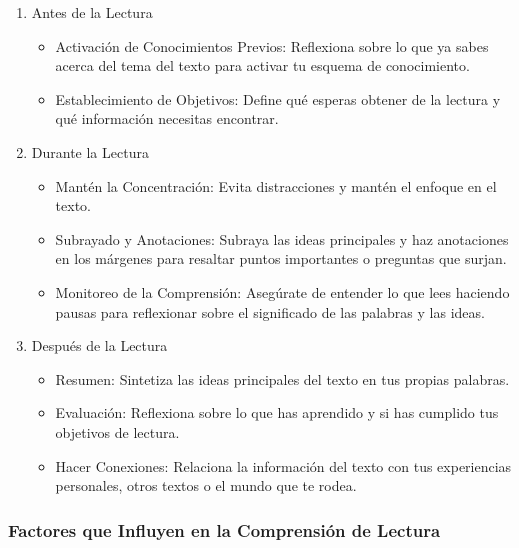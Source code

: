 \begin{enumerate}
      \item Antes de la Lectura
            \begin{itemize}
                  \item Activación de Conocimientos Previos: Reflexiona sobre lo que ya sabes acerca del tema del texto para activar tu esquema de conocimiento.
                  \item Establecimiento de Objetivos: Define qué esperas obtener de la lectura y qué información necesitas encontrar.
            \end{itemize}
      \item Durante la Lectura
            \begin{itemize}
                  \item Mantén la Concentración: Evita distracciones y mantén el enfoque en el texto.
                  \item Subrayado y Anotaciones: Subraya las ideas principales y haz anotaciones en los márgenes para resaltar puntos importantes o preguntas que surjan.
                  \item Monitoreo de la Comprensión: Asegúrate de entender lo que lees haciendo pausas para reflexionar sobre el significado de las palabras y las ideas.
            \end{itemize}
      \item Después de la Lectura
            \begin{itemize}
                  \item Resumen: Sintetiza las ideas principales del texto en tus propias palabras.
                  \item Evaluación: Reflexiona sobre lo que has aprendido y si has cumplido tus objetivos de lectura.
                  \item Hacer Conexiones: Relaciona la información del texto con tus experiencias personales, otros textos o el mundo que te rodea.
            \end{itemize}
\end{enumerate}

\subsubsection{Factores que Influyen en la Comprensión de Lectura}

